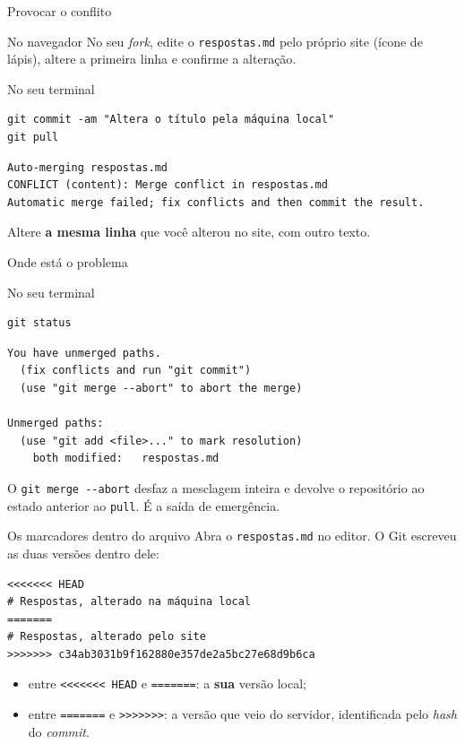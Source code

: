 \documentclass{beamer}
\newcommand{\ddash}{-\mbox{}-}
\newenvironment{noterminal}
  {\begin{exampleblock}{No seu terminal}}
  {\end{exampleblock}}
\newenvironment{nonavegador}
  {\begin{exampleblock}{No navegador}}
  {\end{exampleblock}}
\begin{document}
\begin{frame}[fragile]{Provocar o conflito}
  \begin{nonavegador}
    No seu \textit{fork}, edite o \texttt{respostas.md} pelo próprio site (ícone de
    lápis), altere a primeira linha e confirme a alteração.
  \end{nonavegador}

  \begin{noterminal}
    \begin{verbatim}
git commit -am "Altera o título pela máquina local"
git pull
    \end{verbatim}
  \end{noterminal}

  \begin{verbatim}
Auto-merging respostas.md
CONFLICT (content): Merge conflict in respostas.md
Automatic merge failed; fix conflicts and then commit the result.
  \end{verbatim}

  Altere \textbf{a mesma linha} que você alterou no site, com outro texto.
\end{frame}

\begin{frame}[fragile]{Onde está o problema}
  \begin{noterminal}
    \begin{verbatim}
git status
    \end{verbatim}
  \end{noterminal}

  \begin{verbatim}
You have unmerged paths.
  (fix conflicts and run "git commit")
  (use "git merge --abort" to abort the merge)

Unmerged paths:
  (use "git add <file>..." to mark resolution)
	both modified:   respostas.md
  \end{verbatim}

  O \texttt{git merge \ddash abort} desfaz a mesclagem inteira e devolve o
  repositório ao estado anterior ao \texttt{pull}. É a saída de emergência.
\end{frame}

\begin{frame}[fragile]{Os marcadores dentro do arquivo}
  Abra o \texttt{respostas.md} no editor. O Git escreveu as duas versões dentro
  dele:

  \begin{verbatim}
<<<<<<< HEAD
# Respostas, alterado na máquina local
=======
# Respostas, alterado pelo site
>>>>>>> c34ab3031b9f162880e357de2a5bc27e68d9b6ca
  \end{verbatim}

  \begin{itemize}
    \item entre \texttt{<<<<<<< HEAD} e \texttt{=======}: a \textbf{sua} versão
          local;
    \item entre \texttt{=======} e \texttt{>>>>>>>}: a versão que veio do
          servidor, identificada pelo \textit{hash} do \textit{commit}.
  \end{itemize}
\end{frame}
\end{document}
